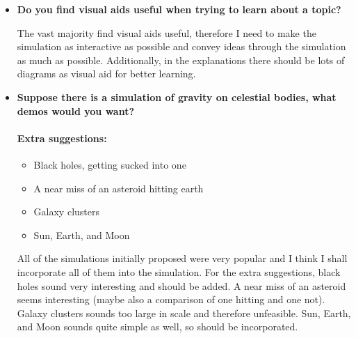\documentclass[12pt]{article}
\begin{document}
\begin{itemize}
    \item \textbf{Do you find visual aids useful when trying to learn about a topic?}
\begin{center}
\end{center}
The vast majority find visual aids useful, therefore I need to make the simulation as interactive as possible and convey ideas through the simulation as much as possible. Additionally, in the explanations there should be lots of diagrams as visual aid for better learning.
\end{itemize}


\begin{itemize}
    \item \textbf{Suppose there is a simulation of gravity on celestial bodies, what demos would you want?}
\begin{center}
\end{center}
\newpage
\paragraph{Extra suggestions:} \begin{itemize}
    \item Black holes, getting sucked into one
    \item A near miss of an asteroid hitting earth
    \item Galaxy clusters
    \item Sun, Earth, and Moon
\end{itemize}
All of the simulations initially proposed were very popular and I think I shall incorporate all of them into the simulation. For the extra suggestions, black holes sound very interesting and should be added. A near miss of an asteroid seems interesting (maybe also a comparison of one hitting and one not). Galaxy clusters sounds too large in scale and therefore unfeasible. Sun, Earth, and Moon sounds quite simple as well, so should be incorporated.
\end{itemize}
\end{document}
